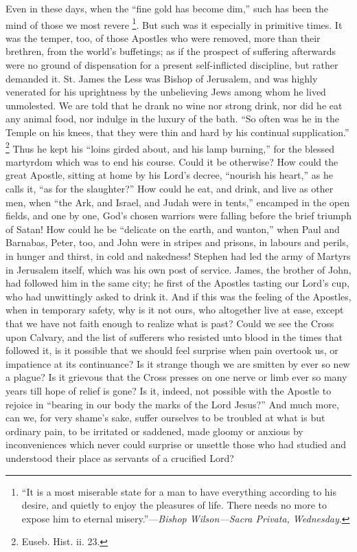 Even in these days, when the ``fine gold has become dim,''
such has been the mind of those we most revere \footnote{``It is a most miserable state for a man
to have everything according to his desire, and quietly to enjoy the
pleasures of life. There needs no more to expose him to eternal
misery.''—\emph{Bishop Wilson—Sacra Privata, Wednesday}.}. But such was it especially in primitive times. It was the
temper, too, of those Apostles who were removed, more than their
brethren, from the world's buffetings; as if the prospect of suffering
afterwards were no ground of dispensation for a present self-inflicted
discipline, but rather demanded it. St. James the Less was Bishop of
Jerusalem, and was highly venerated for his uprightness by the
unbelieving Jews among whom he lived unmolested. We are told that he
drank no wine nor strong drink, nor did he eat any animal food, nor
indulge in the luxury of the bath. ``So often was he in the Temple
on his knees, that they were thin and hard by his continual
supplication.'' \footnote{Euseb. Hist. ii. 23.} Thus
he kept his ``loins girded about, and his lamp burning,'' for
the blessed martyrdom which was to end his course. Could it be
otherwise? How could the great Apostle, sitting at home by his Lord's
decree, ``nourish his heart,'' as he calls it, ``as for
the slaughter?'' How could he eat, and drink, and live as other
men, when ``the Ark, and Israel, and Judah were in tents,''
encamped in the open fields, and one by one, God's chosen warriors
were falling before the brief triumph of Satan! How could he be
``delicate on the earth, and wanton,'' when Paul and Barnabas,
Peter, too, and John were in stripes and prisons, in labours and
perils, in hunger and thirst, in cold and nakedness! Stephen had led
the army of Martyrs in Jerusalem itself, which was his own post of
service. James, the brother of John, had followed him in the same
city; he first of the Apostles tasting our Lord's cup, who had
unwittingly asked to drink it. And if this was the feeling of the
Apostles, when in temporary safety, why is it not ours, who altogether
live at ease, except that we have not faith enough to realize what is
past? Could we see the Cross upon Calvary, and the list of sufferers
who resisted unto blood in the times that followed it, is it possible
that we should feel surprise when pain overtook us, or impatience at
its continuance? Is it strange though we are smitten by ever so new a
plague? Is it grievous that the Cross presses on one nerve or limb
ever so many years till hope of relief is gone? Is it, indeed, not
possible with the Apostle to rejoice in ``bearing in our body the
marks of the Lord Jesus?'' And much more, can we, for very shame's
sake, suffer ourselves to be troubled at what is but ordinary pain, to
be irritated or saddened, made gloomy or anxious by inconveniences
which never could surprise or unsettle those who had studied and
understood their place as servants of a crucified Lord?

